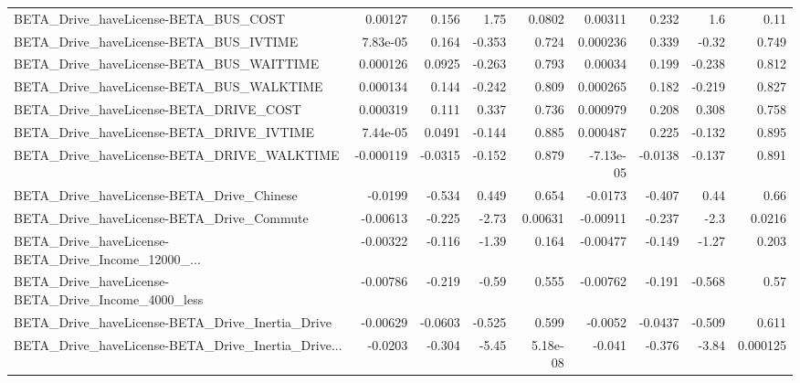 \begin{tabular}{lrrrrrrrr}
BETA\_Drive\_haveLicense-BETA\_BUS\_COST               &     0.00127 &        0.156 &     1.75 &   0.0802 &    0.00311 &       0.232 &          1.6 &          0.11 \\
BETA\_Drive\_haveLicense-BETA\_BUS\_IVTIME             &    7.83e-05 &        0.164 &   -0.353 &    0.724 &   0.000236 &       0.339 &        -0.32 &         0.749 \\
BETA\_Drive\_haveLicense-BETA\_BUS\_WAITTIME           &    0.000126 &       0.0925 &   -0.263 &    0.793 &    0.00034 &       0.199 &       -0.238 &         0.812 \\
BETA\_Drive\_haveLicense-BETA\_BUS\_WALKTIME           &    0.000134 &        0.144 &   -0.242 &    0.809 &   0.000265 &       0.182 &       -0.219 &         0.827 \\
BETA\_Drive\_haveLicense-BETA\_DRIVE\_COST             &    0.000319 &        0.111 &    0.337 &    0.736 &   0.000979 &       0.208 &        0.308 &         0.758 \\
BETA\_Drive\_haveLicense-BETA\_DRIVE\_IVTIME           &    7.44e-05 &       0.0491 &   -0.144 &    0.885 &   0.000487 &       0.225 &       -0.132 &         0.895 \\
BETA\_Drive\_haveLicense-BETA\_DRIVE\_WALKTIME         &   -0.000119 &      -0.0315 &   -0.152 &    0.879 &  -7.13e-05 &     -0.0138 &       -0.137 &         0.891 \\
BETA\_Drive\_haveLicense-BETA\_Drive\_Chinese          &     -0.0199 &       -0.534 &    0.449 &    0.654 &    -0.0173 &      -0.407 &         0.44 &          0.66 \\
BETA\_Drive\_haveLicense-BETA\_Drive\_Commute          &    -0.00613 &       -0.225 &    -2.73 &  0.00631 &   -0.00911 &      -0.237 &         -2.3 &        0.0216 \\
BETA\_Drive\_haveLicense-BETA\_Drive\_Income\_12000\_... &    -0.00322 &       -0.116 &    -1.39 &    0.164 &   -0.00477 &      -0.149 &        -1.27 &         0.203 \\
BETA\_Drive\_haveLicense-BETA\_Drive\_Income\_4000\_less &    -0.00786 &       -0.219 &    -0.59 &    0.555 &   -0.00762 &      -0.191 &       -0.568 &          0.57 \\
BETA\_Drive\_haveLicense-BETA\_Drive\_Inertia\_Drive    &    -0.00629 &      -0.0603 &   -0.525 &    0.599 &    -0.0052 &     -0.0437 &       -0.509 &         0.611 \\
BETA\_Drive\_haveLicense-BETA\_Drive\_Inertia\_Drive... &     -0.0203 &       -0.304 &    -5.45 & 5.18e-08 &     -0.041 &      -0.376 &        -3.84 &      0.000125 \\

\end{tabular}
